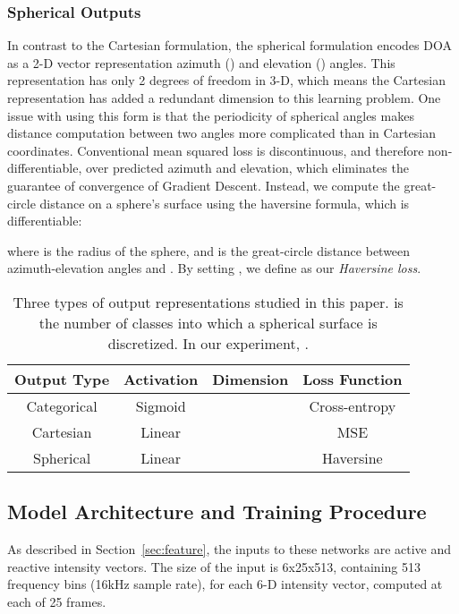 \documentclass[a4paper]{article}
\begin{document}
\subsubsection{Spherical Outputs}
In contrast to the Cartesian formulation, the spherical formulation encodes DOA as a 2-D vector representation azimuth () and elevation () angles. This representation has only 2 degrees of freedom in 3-D, which means the Cartesian representation has added a redundant dimension to this learning problem. One issue with using this form is that the periodicity of spherical angles makes distance computation between two angles more complicated than in Cartesian coordinates. Conventional mean squared loss is discontinuous, and therefore non-differentiable, over predicted azimuth and elevation, which eliminates the guarantee of convergence of Gradient Descent. Instead, we compute the great-circle distance on a sphere's surface using the haversine formula, which is differentiable:

where  is the radius of the sphere, and  is the great-circle distance between azimuth-elevation angles  and . By setting , we define  as our \emph{Haversine loss}.

\begin{table}[htbp]
\caption{Three types of output representations studied in this paper.  is the number of classes into which a spherical surface is discretized. In our experiment, .}
\vspace{-1em}
\label{tab:output}
\centering
\begin{tabular}{cccc}
\toprule
Output Type   & Activation &  Dimension & Loss Function \\\hline
Categorical  & Sigmoid  &   & Cross-entropy \\
Cartesian &  Linear &   & MSE \\
Spherical   & Linear &  & Haversine 
\\\bottomrule
\end{tabular}
\vspace{-2em}
\end{table}


\subsection{Model Architecture and Training Procedure}

As described in Section~\ref{sec:feature}, the inputs to these networks are active and reactive intensity vectors. The size of the input is 6x25x513, containing 513 frequency bins (16kHz sample rate), for each 6-D intensity vector, computed at each of 25 frames.
\end{document}
